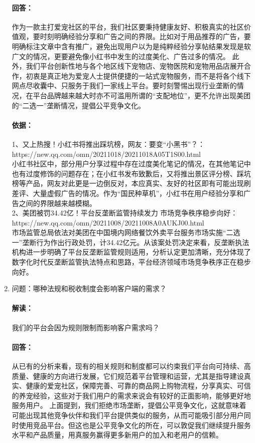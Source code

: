 \documentclass[a4paper]{ctexart}
\begin{document}
\begin{enumerate}[label=\alph*.]
  \paragraph{回答：}作为一款主打爱宠社区的平台，我们社区要秉持健康友好、积极真实的社区价值观，要时刻明确经验分享和广告之间的界限。比如对于用品推荐的广告，要明确标注文章中含有推广，避免出现用户以为是纯粹经验分享帖结果发现是软广文的情况，更要避免像小红书中发生的过度美化、广告过多的情况。
  此外，我们平台创新性地与各个地区线下宠物店、宠物医院和宠物用品店展开合作，初衷是真正地为爱宠人士提供便捷的一站式宠物服务，而不是将各个线下网点尽收囊中、只服务于我们一家线上平台。要时刻警惕出现行业垄断的情况，在平台品牌越来越大时亦不可滥用所谓的“支配地位”，更不允许出现美团的“二选一”垄断情况，提倡公平竞争文化。
  \paragraph{依据：}1、又上热搜！小红书将推出踩坑榜，网友：要变“小黑书”？：\\https://new.qq.com/omn/20211018/20211018A05T1S00.html\\
  小红书社区中，部分用户分享过程中存在过度美化笔记的情况，在其他笔记中也有过度修饰的问题存在；在小红书发布致歉后，又将推出景区评分榜、踩坑榜等产品，网友对此更是一边倒反对，本应真实、友好的社区即有可能出现刷差评、大量虚假广告的情况。作为“国民种草机”，小红书在用户经验分享和广告之间的界限越来越模糊。\\2、美团被罚34.42亿！平台反垄断监管持续发力 市场竞争秩序稳步向好：\\https://new.qq.com/omn/20211008/20211008A0AUKJ00.html\\
  市场监管总局依法对美团在中国境内网络餐饮外卖平台服务市场实施“二选一”垄断行为作出行政处罚，计34.42亿元。从该案处罚决定来看，反垄断执法机构进一步明确了平台反垄断监管规则适用，分析认定更加清晰，充分体现了数字化时代反垄断监管执法特点和思路，平台经济领域市场竞争秩序正在稳步向好。
  \item 问题：哪种法规和税收制度会影响客户端的需求？
  \paragraph{解读：}我们的平台会因为规则限制而影响客户需求吗？
  \paragraph{回答：}从已有的分析来看，现有的相关规则和制度都可以约束我们平台向可持续、高质量、健康的方向进行发展，它们规范着平台管理和运营，尤其是指导建设真实、健康的爱宠社区，保障完善、可靠的商品网上购物流程，分享真实、可信的养宠经验，这些对于我们用户的需求来说会有较好的正面影响，能够更好地服务用户。
  上面提到，我们拒绝市场垄断，提倡公平竞争文化，这就意味着可能出现其他竞争伙伴和我们平台提供类似的服务，从而可能吸引部分用户同时使用竞品平台。但这也是公平竞争文化的所在，可以敦促我们继续提升服务水平和产品质量，用真服务赢得更多新用户的加入和老用户的信赖。
 \end{enumerate}
\end{document}
